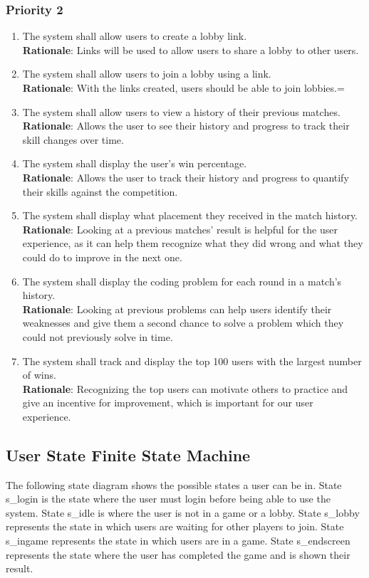 \documentclass[12pt, titlepage]{article}
\begin{document}
\subsubsection{Priority 2}
\begin{enumerate}[label=FR.\arabic*, resume]
    \item The system shall allow users to create a lobby link. \label{FR.18}\\
     \textbf{Rationale}: Links will be used to allow users to share a lobby to other users.
    \item The system shall allow users to join a lobby using a link. \label{FR.19}\\
      \textbf{Rationale}: With the links created, users should be able to join lobbies.=
    \item The system shall allow users to view a history of their previous matches. \label{FR.20}
     \textbf{Rationale}: Allows the user to see their history and progress to track their skill changes over time.
    \item The system shall display the user's win percentage. \label{FR.21}\\
     \textbf{Rationale}: Allows the user to track their history and progress to quantify their skills against the competition.
    \item The system shall display what placement they received in the match history. \\
    \textbf{Rationale}: Looking at a previous matches' result is helpful for the user experience, as it can help them recognize what they did wrong and what they could do to improve in the next one.
    \label{FR.22}
    \item The system shall display the coding problem for each round in a match's history.\\
    \textbf{Rationale}: Looking at previous problems can help users identify their weaknesses and give them a second chance to solve a problem which they could not previously solve in time. \label{FR.23}
    \item The system shall track and display the top 100 users with the largest number of wins. \label{FR.24}\\
    \textbf{Rationale}: Recognizing the top users can motivate others to practice and give an incentive for improvement, which is important for our user experience. 

\end{enumerate}

\subsection{User State Finite State Machine}
The following state diagram shows the possible states a user can be in. State s\_login is the state where the user must login before being able to use the system. State s\_idle is where the user is not in a game or a lobby. State s\_lobby represents the state in which users are waiting for other players to join. State s\_ingame represents the state in which users are in a game. State s\_endscreen represents the state where the user has completed the game and is shown their result.
\end{document}
